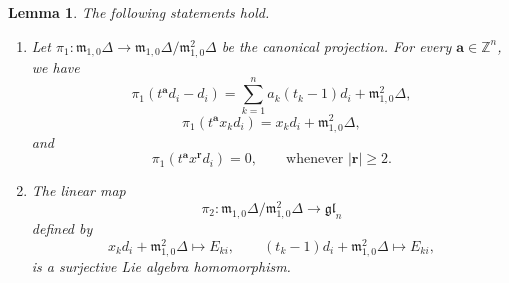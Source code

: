 \documentclass[12pt,a4paper]{amsart}
\newtheorem{lemma}[theorem]{Lemma}%
\numberwithin{equation}{section}
\def\ba{\mathbf{a}}
\def\br{\mathbf{r}}
\begin{document}
\begin{lemma}\label{lem:gln-quotient1}
The following statements hold.

\begin{enumerate}
\item
Let $
\pi_1\colon
\mathfrak m_{1,0}\Delta
\longrightarrow
\mathfrak m_{1,0}\Delta/
\mathfrak m_{1,0}^{2}\Delta
$
be the canonical projection. For every
\(\ba\in\mathbb Z^n\), we have
\[
\pi_1(t^\ba d_i-d_i)
 =
 \sum_{k=1}^{n}a_k(t_k-1)d_i
 +\mathfrak m_{1,0}^{2}\Delta,
\]
\[
\pi_1(t^\ba x_kd_i)
 =
 x_kd_i+\mathfrak m_{1,0}^{2}\Delta,
\]
and
\[
\pi_1(t^\ba x^\br d_i)=0,
\qquad\text{whenever } |\br|\geq 2.
\]

\item
The linear map
\[
\pi_2\colon
\mathfrak m_{1,0}\Delta/
\mathfrak m_{1,0}^{2}\Delta
\rightarrow
\mathfrak{gl}_n
\]
defined by
\[
x_kd_i+\mathfrak m_{1,0}^{2}\Delta
\mapsto E_{ki},
\qquad
(t_k-1)d_i+\mathfrak m_{1,0}^{2}\Delta
\mapsto E_{ki},
\]
is a surjective Lie algebra homomorphism.
\end{enumerate}
\end{lemma}
\end{document}
